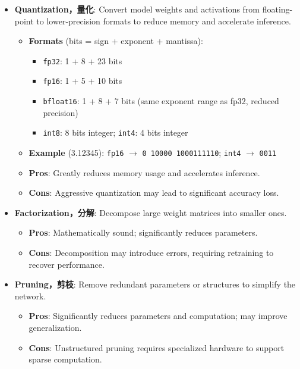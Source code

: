 \documentclass[UTF8]{ctexart}
\begin{document}
\begin{itemize}
    \item \textbf{Quantization，量化}: Convert model weights and activations from floating-point to lower-precision formats to reduce memory and accelerate inference.
    \begin{itemize}
        \item \textbf{Formats} (bits = sign + exponent + mantissa):
        \begin{itemize}
            \item \texttt{fp32}: 1 + 8 + 23 bits
            \item \texttt{fp16}: 1 + 5 + 10 bits
            \item \texttt{bfloat16}: 1 + 8 + 7 bits (same exponent range as fp32, reduced precision)
            \item \texttt{int8}: 8 bits integer; \texttt{int4}: 4 bits integer
        \end{itemize}
        \item \textbf{Example} (3.12345): \texttt{fp16} $\to$ \texttt{0 10000 1000111110}; \texttt{int4} $\to$ \texttt{0011}
        \item \textbf{Pros}: Greatly reduces memory usage and accelerates inference.
        \item \textbf{Cons}: Aggressive quantization may lead to significant accuracy loss.
    \end{itemize}

    \item \textbf{Factorization，分解}: Decompose large weight matrices into smaller ones.
    \begin{itemize}
        \item \textbf{Pros}: Mathematically sound; significantly reduces parameters.
        \item \textbf{Cons}: Decomposition may introduce errors, requiring retraining to recover performance.
    \end{itemize}

    \item \textbf{Pruning，剪枝}: Remove redundant parameters or structures to simplify the network.
    \begin{itemize}
        \item \textbf{Pros}: Significantly reduces parameters and computation; may improve generalization.
        \item \textbf{Cons}: Unstructured pruning requires specialized hardware to support sparse computation.
    \end{itemize}
\end{itemize}
\end{document}
